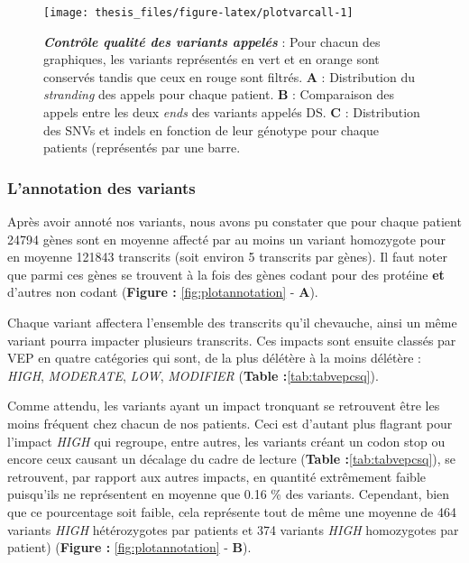 \documentclass[12pt,twoside]{ugathesis}
\begin{document}
\newpage

\begin{figure}

{\centering \texttt{[image: thesis\_files/figure-latex/plotvarcall-1]} 

}

\caption[Contrôle qualité des variants appelés]{\textbf{\emph{Contrôle qualité des variants appelés}}
: Pour chacun des graphiques, les variants représentés en vert et en
orange sont conservés tandis que ceux en rouge sont filtrés. \textbf{A}
: Distribution du \emph{stranding} des appels pour chaque patient.
\textbf{B} : Comparaison des appels entre les deux \emph{ends} des
variants appelés DS. \textbf{C} : Distribution des SNVs et indels en
fonction de leur génotype pour chaque patients (représentés par une
barre.}\label{fig:plotvarcall}
\end{figure}










\newpage

\subsubsection{L'annotation des
variants}\label{lannotation-des-variants}

Après avoir annoté nos variants, nous avons pu constater que pour chaque
patient 24794 gènes sont en moyenne affecté par au moins un variant
homozygote pour en moyenne 121843 transcrits (soit environ 5 transcrits
par gènes). Il faut noter que parmi ces gènes se trouvent à la fois des
gènes codant pour des protéine \textbf{et} d'autres non codant
(\textbf{Figure : }\ref{fig:plotannotation} - \textbf{A}).

Chaque variant affectera l'ensemble des transcrits qu'il chevauche,
ainsi un même variant pourra impacter plusieurs transcrits. Ces impacts
sont ensuite classés par VEP en quatre catégories qui sont, de la plus
délétère à la moins délétère : \emph{HIGH}, \emph{MODERATE}, \emph{LOW},
\emph{MODIFIER} (\textbf{Table :}\ref{tab:tabvepcsq}).

Comme attendu, les variants ayant un impact tronquant se retrouvent être
les moins fréquent chez chacun de nos patients. Ceci est d'autant plus
flagrant pour l'impact \emph{HIGH} qui regroupe, entre autres, les
variants créant un codon stop ou encore ceux causant un décalage du
cadre de lecture (\textbf{Table :}\ref{tab:tabvepcsq}), se retrouvent,
par rapport aux autres impacts, en quantité extrêmement faible
puisqu'ils ne représentent en moyenne que 0.16 \% des variants.
Cependant, bien que ce pourcentage soit faible, cela représente tout de
même une moyenne de 464 variants \emph{HIGH} hétérozygotes par patients
et 374 variants \emph{HIGH} homozygotes par patient) (\textbf{Figure :
}\ref{fig:plotannotation} - \textbf{B}).
\end{document}

